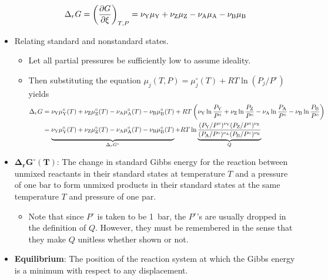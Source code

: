 \documentclass[../notes.tex]{subfiles}
\begin{document}
\begin{itemize}
    \begin{equation*}
        \Delta_rG = \left( \pdv{G}{\xi} \right)_{T,P}
        = \nu_{\ce{Y}}\mu_{\ce{Y}}+\nu_{\ce{Z}}\mu_{\ce{Z}}-\nu_{\ce{A}}\mu_{\ce{A}}-\nu_{\ce{B}}\mu_{\ce{B}}
    \end{equation*}
    \item Relating standard and nonstandard states.
    \begin{itemize}
        \item Let all partial pressures be sufficiently low to assume ideality.
        \item Then substituting the equation $\mu_j(T,P)=\mu_j^\circ(T)+RT\ln(P_j/P^\circ)$ yields
        \begin{align*}
            \Delta_rG &= \nu_{\ce{Y}}\mu_{\ce{Y}}^\circ(T)+\nu_{\ce{Z}}\mu_{\ce{Z}}^\circ(T)-\nu_{\ce{A}}\mu_{\ce{A}}^\circ(T)-\nu_{\ce{B}}\mu_{\ce{B}}^\circ(T)+RT\left( \nu_{\ce{Y}}\ln\frac{P_{\ce{Y}}}{P^\circ}+\nu_{\ce{Z}}\ln\frac{P_{\ce{Z}}}{P^\circ}-\nu_{\ce{A}}\ln\frac{P_{\ce{A}}}{P^\circ}-\nu_{\ce{B}}\ln\frac{P_{\ce{B}}}{P^\circ} \right)\\
            &= \underbrace{\nu_{\ce{Y}}\mu_{\ce{Y}}^\circ(T)+\nu_{\ce{Z}}\mu_{\ce{Z}}^\circ(T)-\nu_{\ce{A}}\mu_{\ce{A}}^\circ(T)-\nu_{\ce{B}}\mu_{\ce{B}}^\circ(T)\vphantom{\frac{(P_{\ce{Y}}/P^\circ)^{\nu_{\ce{Y}}}(P_{\ce{Z}}/P^\circ)^{\nu_{\ce{Z}}}}{(P_{\ce{A}}/P^\circ)^{\nu_{\ce{A}}}(P_{\ce{B}}/P^\circ)^{\nu_{\ce{B}}}}}}_{\Delta_rG^\circ}+RT\ln\underbrace{\frac{(P_{\ce{Y}}/P^\circ)^{\nu_{\ce{Y}}}(P_{\ce{Z}}/P^\circ)^{\nu_{\ce{Z}}}}{(P_{\ce{A}}/P^\circ)^{\nu_{\ce{A}}}(P_{\ce{B}}/P^\circ)^{\nu_{\ce{B}}}}}_Q
        \end{align*}
    \end{itemize}
    \item $\bm{\Delta_rG^\circ(T)}$: The change in standard Gibbs energy for the reaction between unmixed reactants in their standard states at temperature $T$ and a pressure of one bar to form unmixed products in their standard states at the same temperature $T$ and pressure of one par.
    \begin{itemize}
        \item Note that since $P^\circ$ is taken to be \SI{1}{\bar}, the $P^\circ$'s are usually dropped in the definition of $Q$. However, they must be remembered in the sense that they make $Q$ unitless whether shown or not.
    \end{itemize}
    \item \textbf{Equilibrium}: The position of the reaction system at which the Gibbs energy is a minimum with respect to any displacement.

\end{itemize}
\end{document}
